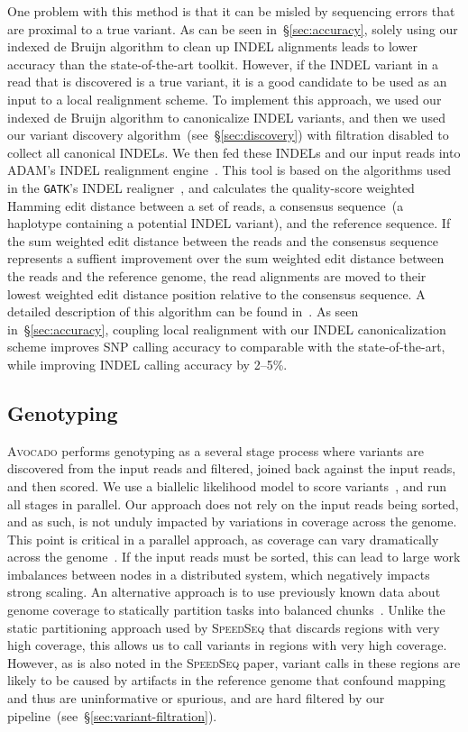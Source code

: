 \documentclass{bioinfo}
\begin{document}
\begin{methods}
One problem with this method is that it can be misled by sequencing errors
that are proximal to a true variant. As can be seen in~\S\ref{sec:accuracy},
solely using our indexed de Bruijn algorithm to clean up INDEL alignments leads
to lower accuracy than the state-of-the-art toolkit. However, if the INDEL
variant in a read that is discovered is a true variant, it is a good candidate
to be used as an input to a local realignment scheme.  To implement this
approach, we used our indexed de Bruijn algorithm to canonicalize INDEL variants,
and then we used our variant discovery algorithm~(see~\S\ref{sec:discovery})
with filtration disabled to collect all canonical INDELs. We then fed these
INDELs and our input reads into \textsc{ADAM}'s INDEL realignment
engine~\citep{massie13, nothaft15}. This tool is based on the algorithms used in
the \texttt{GATK}'s INDEL realigner~\citep{depristo11}, and calculates the quality-score
weighted Hamming edit distance between a set of reads, a consensus sequence~(a
haplotype containing a potential INDEL variant), and the reference sequence. If
the sum weighted edit distance between the reads and the consensus sequence
represents a suffient improvement over the sum weighted edit distance between
the reads and the reference genome, the read alignments are moved to their
lowest weighted edit distance position relative to the consensus sequence.
A detailed description of this algorithm can be found in~\citet{nothaft15avocado}.
As seen in~\S\ref{sec:accuracy}, coupling local realignment with our INDEL
canonicalization scheme improves SNP calling accuracy to comparable with the
state-of-the-art, while improving INDEL calling accuracy by 2--5\%.

\subsection{Genotyping}
\label{sec:genotyping}

\textsc{Avocado} performs genotyping as a several stage process where variants
are discovered from the input reads and filtered, joined back against the input
reads, and then scored. We use a biallelic likelihood model to score
variants~\citep{li11}, and run all stages in parallel. Our approach does not
rely on the input reads being sorted, and as such, is not unduly impacted by
variations in coverage across the genome. This point is critical in a parallel
approach, as coverage can vary dramatically across the genome~\citep{pinard06}.
If the input reads must be sorted, this can lead to large work imbalances
between nodes in a distributed system, which negatively impacts strong scaling.
An alternative approach is to use previously known data about genome coverage
to statically partition tasks into balanced chunks~\cite{chiang15}. Unlike the
static partitioning approach used by \textsc{SpeedSeq} that discards regions with
very high coverage, this allows us to call variants in regions with very high
coverage. However, as is also noted in the \textsc{SpeedSeq} paper, variant calls
in these regions are likely to be caused by artifacts in the reference genome that
confound mapping and thus are uninformative or spurious, and are hard filtered by
our pipeline~(see~\S\ref{sec:variant-filtration}).


\end{methods}
\end{document}
